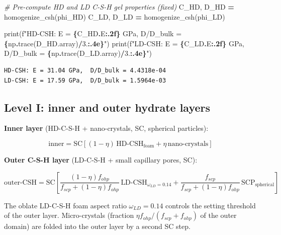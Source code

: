 \documentclass[
  a4paper,
  numbers=noendperiod,
  DIV=12]{scrreprt}
\newenvironment{Shaded}{\begin{snugshade}}{\end{snugshade}}
\newcommand{\BuiltInTok}[1]{#1}
\newcommand{\CommentTok}[1]{\textcolor[rgb]{0.56,0.35,0.01}{\textit{#1}}}
\newcommand{\FloatTok}[1]{\textcolor[rgb]{0.00,0.00,0.81}{#1}}
\newcommand{\NormalTok}[1]{#1}
\newcommand{\OperatorTok}[1]{\textcolor[rgb]{0.81,0.36,0.00}{\textbf{#1}}}
\newcommand{\SpecialCharTok}[1]{\textcolor[rgb]{0.81,0.36,0.00}{\textbf{#1}}}
\newcommand{\SpecialStringTok}[1]{\textcolor[rgb]{0.31,0.60,0.02}{#1}}
\begin{document}
\begin{Shaded}
\begin{Highlighting}[]
\CommentTok{\# Pre{-}compute HD and LD C{-}S{-}H gel properties (fixed)}
\NormalTok{C\_HD, D\_HD }\OperatorTok{=}\NormalTok{ homogenize\_csh(phi\_HD)}
\NormalTok{C\_LD, D\_LD }\OperatorTok{=}\NormalTok{ homogenize\_csh(phi\_LD)}

\BuiltInTok{print}\NormalTok{(}\SpecialStringTok{f"HD{-}CSH: E = }\SpecialCharTok{\{}\NormalTok{C\_HD}\SpecialCharTok{.}\NormalTok{E}\SpecialCharTok{:.2f\}}\SpecialStringTok{ GPa,  D/D\_bulk = }\SpecialCharTok{\{}\NormalTok{np}\SpecialCharTok{.}\NormalTok{trace(D\_HD.array)}\OperatorTok{/}\FloatTok{3.}\SpecialCharTok{:.4e\}}\SpecialStringTok{"}\NormalTok{)}
\BuiltInTok{print}\NormalTok{(}\SpecialStringTok{f"LD{-}CSH: E = }\SpecialCharTok{\{}\NormalTok{C\_LD}\SpecialCharTok{.}\NormalTok{E}\SpecialCharTok{:.2f\}}\SpecialStringTok{ GPa,  D/D\_bulk = }\SpecialCharTok{\{}\NormalTok{np}\SpecialCharTok{.}\NormalTok{trace(D\_LD.array)}\OperatorTok{/}\FloatTok{3.}\SpecialCharTok{:.4e\}}\SpecialStringTok{"}\NormalTok{)}
\end{Highlighting}
\end{Shaded}

\begin{verbatim}
HD-CSH: E = 31.04 GPa,  D/D_bulk = 4.4318e-04
LD-CSH: E = 17.59 GPa,  D/D_bulk = 1.5964e-03
\end{verbatim}

\subsection{Level I: inner and outer hydrate
layers}\label{sec-hydrate-layers}

\textbf{Inner layer} (HD-C-S-H + nano-crystals, SC, spherical
particles):

\[
\text{inner} = \text{SC}\!\left[(1-\eta)\,\text{HD-CSH}_\text{foam} +
\eta\,\text{nano-crystals}\right]
\]

\textbf{Outer C-S-H layer} (LD-C-S-H + small capillary pores, SC):

\[
\text{outer-CSH} = \text{SC}\!\left[\frac{(1-\eta)f_{ohp}}{f_{scp}+(1-\eta)f_{ohp}}\,
\text{LD-CSH}_{\omega_{LD}=0.14} + \frac{f_{scp}}{f_{scp}+(1-\eta)f_{ohp}}\,
\text{SCP}_\text{spherical}\right]
\]

The oblate LD-C-S-H foam aspect ratio \(\omega_{LD} = 0.14\) controls
the setting threshold of the outer layer. Micro-crystals (fraction
\(\eta f_{ohp}/(f_{scp}+f_{ohp})\) of the outer domain) are folded into
the outer layer by a second SC step.
\end{document}
